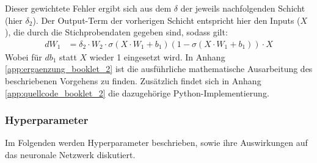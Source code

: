 Dieser gewichtete Fehler ergibt sich aus dem $\delta$ der jeweils nachfolgenden Schicht (hier $\delta_{2}$). Der Output-Term der vorherigen Schicht entspricht hier den Inputs ($X$), die durch die Stichprobendaten gegeben sind, sodass gilt:
\begin{align*}
dW_{1} &= \delta_{2}\cdot W_{2} \cdot \sigma(X\cdot W_{1}+b_{1})(1- \sigma(X\cdot W_{1}+b_{1})) \cdot X
\end{align*}
\noindent
Wobei für $db_{1}$ statt $X$ wieder 1 eingesetzt wird. In Anhang \ref{app:ergaenzung_booklet_2} ist die ausführliche mathematische Ausarbeitung des beschriebenen Vorgehens zu finden. Zusätzlich findet sich in Anhang \ref{app:quellcode_booklet_2} die dazugehörige Python-Implementierung.
\subsubsection{Hyperparameter}
Im Folgenden werden Hyperparameter beschrieben, sowie ihre Auswirkungen auf das neuronale Netzwerk diskutiert.
